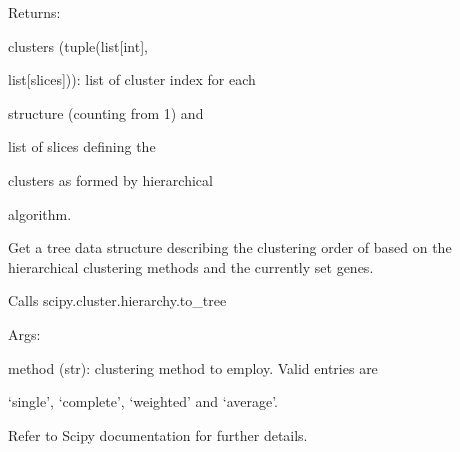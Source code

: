 \documentclass[letterpaper,10pt,english]{sphinxmanual}
\begin{document}
\begin{fulllineitems}
\begin{fulllineitems}
\begin{DUlineblock}{0em}
\item[] Returns:
\item[]
\begin{DUlineblock}{\DUlineblockindent}
\item[] clusters (tuple(list{[}int{]},
\item[]
\begin{DUlineblock}{\DUlineblockindent}
\item[] list{[}slices{]})): list of cluster index for each
\item[]
\begin{DUlineblock}{\DUlineblockindent}
\item[] structure (counting from 1) and
\item[] list of slices defining the
\item[] clusters as formed by hierarchical
\item[] algorithm.
\end{DUlineblock}
\end{DUlineblock}
\end{DUlineblock}
\end{DUlineblock}

\end{fulllineitems}


\begin{fulllineitems}
\label{doctree/soprano.analyse.phylogen.phylogenclust:soprano.analyse.phylogen.phylogenclust.PhylogenCluster.get_hier_tree}
Get a tree data structure describing the clustering order of based
on the hierarchical clustering methods and the currently set genes.

Calls scipy.cluster.hierarchy.to\_tree

\begin{DUlineblock}{0em}
\item[] Args:
\item[]
\begin{DUlineblock}{\DUlineblockindent}
\item[] method (str): clustering method to employ. Valid entries are
\item[]
\begin{DUlineblock}{\DUlineblockindent}
\item[] `single', `complete', `weighted' and `average'.
\item[] Refer to Scipy documentation for further details.
\end{DUlineblock}
\end{DUlineblock}
\end{DUlineblock}


\end{fulllineitems}
\end{fulllineitems}
\end{document}
